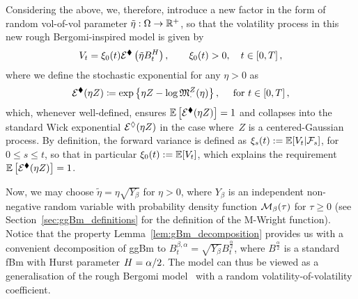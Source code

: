 Considering the above, we, therefore, introduce a new factor in the form of random vol-of-vol parameter $\tilde\eta:\Omega\rightarrow \mathbb{R}^+$, so that the volatility process in this new rough Bergomi-inspired model is given by
\[
V_t = \xi_0(t) \mathcal{E}^\blacklozenge\left(\tilde\eta B_t^{H}\right), \qquad \xi_0(t)>0, \quad t\in[0,T]\,,
\]
where we define the stochastic exponential for any $\eta>0$ as
\begin{equation}
    \mathcal{E}^\blacklozenge(\eta Z) \coloneqq \exp\left\{\eta Z - \log\mathfrak{M}^Z_{\cdot}(\eta)\right\}, \quad \textup{ for }  t\in[0,T]\,,
\end{equation}
which, whenever well-defined, ensures $\mathbb{E}\left[\mathcal{E}^\blacklozenge(\eta Z)\right] = 1$ and collapses into the standard Wick exponential $\mathcal{E}^\lozenge(\eta Z)$ in the case where~$Z$ is a centered-Gaussian process. 
By definition, the forward variance is defined as $\xi_{s}(t) := \mathbb{E}[V_t | \mathcal{F}_{s}]$, for $0\leq s\leq t$, so that in particular
$\xi_{0}(t) := \mathbb{E}[V_t]$, which explains the requirement $\mathbb{E}\left[\mathcal{E}^\blacklozenge(\eta Z)\right] = 1$.

Now, we may choose $\tilde\eta = \eta\sqrt{Y_\beta}$ for $\eta>0$, where $Y_\beta$ is an independent non-negative random variable with probability density function $\mathcal{M}_{\beta}(\tau)$ for $\tau \geq 0$ (see Section~\ref{sec:ggBm_definitions} for the definition of the M-Wright function). Notice that the property Lemma~\ref{lem:gBm_decomposition} provides us with a convenient decomposition of ggBm to $B^{\beta, \alpha}_t = \sqrt{Y_\beta} B^{\frac\alpha2}_t$, where $B^{\frac\alpha2}$ is a standard fBm with Hurst parameter $H=\nobreak\alpha / 2$. The model can thus be viewed as a generalisation of the rough Bergomi model~\cite{Bayer2015PricingVolatility} with a random volatility-of-volatility coefficient.

